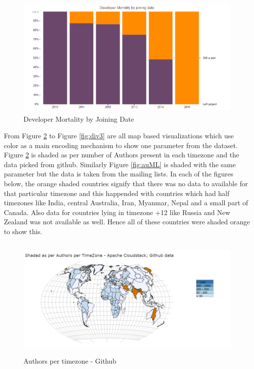 \documentclass[seploa]{beavtex}
\begin{document}
\begin{figure}[H]
\centering
\includegraphics[width=130mm,height=60mm]{image3.PNG}
\caption{Developer Mortality by Joining Date}
\label{fig:devMort}
\end{figure}

From Figure \ref{fig:auHub} to Figure \ref{fig:div3} are all map based visualizations which use color as a main encoding mechanism to show one parameter from the dataset. Figure \ref{fig:auHub} is shaded as per number of Authors present in each timezone and the data picked from github. Similarly Figure \ref{fig:auML} is shaded with the same parameter but the data is taken from the mailing lists. In each of the figures below, the orange shaded countries signify that there was no data to available for that particular timezone and this happended with countries which had half timezones like India, central Australia, Iran, Myanmar, Nepal and a small part of Canada. Also data for countries lying in timezone +12 like Russia and New Zealand was not available as well. Hence all of these countries were shaded orange to show this.

\begin{figure}[H]
\centering
\includegraphics[width=130mm,height=60mm]{image4.PNG}
\caption{Authors per timezone - Github}
\label{fig:auHub}
\end{figure}
\end{document}
